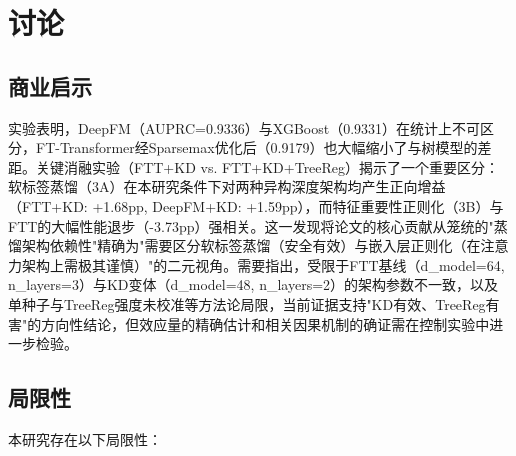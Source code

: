 
\section{讨论}

\subsection{商业启示}

实验表明，DeepFM（AUPRC=0.9336）与XGBoost（0.9331）在统计上不可区分，FT-Transformer经Sparsemax优化后（0.9179）也大幅缩小了与树模型的差距。关键消融实验（FTT+KD vs. FTT+KD+TreeReg）揭示了一个重要区分：软标签蒸馏（3A）在本研究条件下对两种异构深度架构均产生正向增益（FTT+KD: +1.68pp, DeepFM+KD: +1.59pp），而特征重要性正则化（3B）与FTT的大幅性能退步（-3.73pp）强相关。这一发现将论文的核心贡献从笼统的"蒸馏架构依赖性"精确为"需要区分软标签蒸馏（安全有效）与嵌入层正则化（在注意力架构上需极其谨慎）"的二元视角。需要指出，受限于FTT基线（d\_model=64, n\_layers=3）与KD变体（d\_model=48, n\_layers=2）的架构参数不一致，以及单种子与TreeReg强度未校准等方法论局限，当前证据支持"KD有效、TreeReg有害"的方向性结论，但效应量的精确估计和相关因果机制的确证需在控制实验中进一步检验。

\subsection{局限性}

本研究存在以下局限性：


